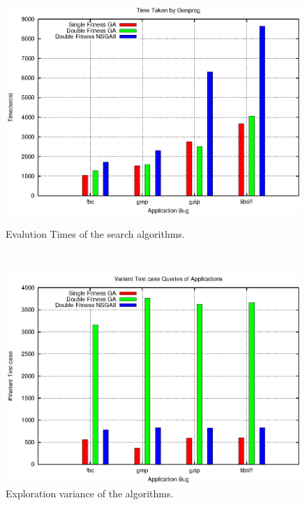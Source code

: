 \begin{figure}[tb!]
  \begin{minipage}{0.45\linewidth}
  \includegraphics[width=\linewidth]{figs/time}
  \caption{Evalution Times of the search algorithms.}
  \label{fig:res_1}
  \end{minipage}~~~\begin{minipage}{0.45\linewidth}
  \centering
    \includegraphics[width=\linewidth]{figs/variant}
    \caption{Exploration variance of the algorithms.}
    \label{fig:res_2}
  \end{minipage}
\end{figure}